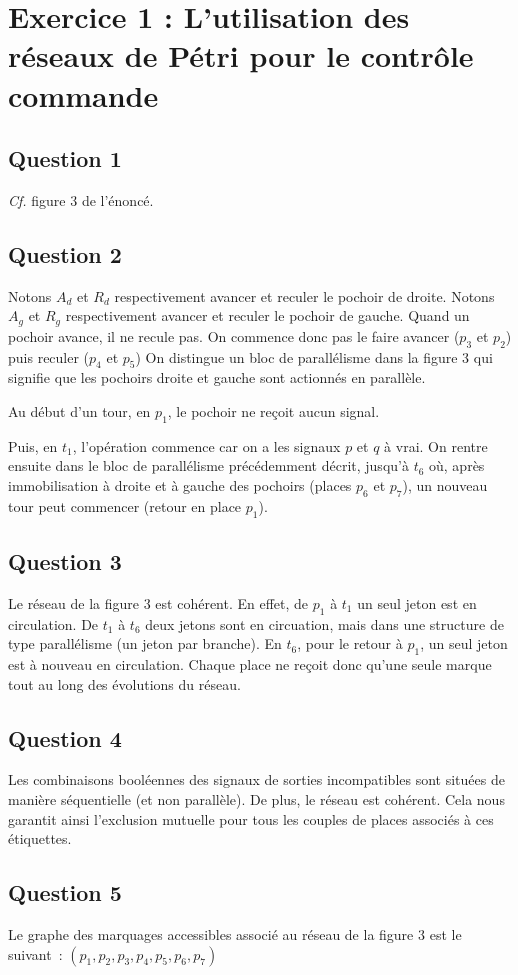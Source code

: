 \section{Exercice 1 : L'utilisation des réseaux de Pétri pour le
  contrôle commande}
\subsection{Question 1}
\textit{Cf.} figure $3$ de l'énoncé.
\subsection{Question 2}
Notons $A_d$ et $R_d$ respectivement avancer et reculer le pochoir de
droite.  Notons $A_g$ et $R_g$ respectivement avancer et reculer le
pochoir de gauche.  Quand un pochoir avance, il ne recule pas.  On
commence donc pas le faire avancer ($p_3$ et $p_2$) puis reculer
($p_4$ et $p_5$) On distingue un bloc de parallélisme dans la figure 3
qui signifie que les pochoirs droite et gauche sont actionnés en
parallèle.

Au début d'un tour, en $p_1$, le pochoir ne reçoit aucun signal.  

Puis, en $t_1$, l'opération commence car on a les signaux $p$ et $q$ à
vrai. On rentre ensuite dans le bloc de parallélisme précédemment
décrit, jusqu'à $t_6$ où, après immobilisation à droite et à gauche
des pochoirs (places $p_6$ et $p_7$), un nouveau tour peut commencer
(retour en place $p_1$).
\subsection{Question 3}
Le réseau de la figure $3$ est cohérent. En effet, de $p_1$ à $t_1$ un
seul jeton est en circulation. De $t_1$ à $t_6$ deux jetons sont en
circuation, mais dans une structure de type parallélisme (un jeton par
branche). En $t_6$, pour le retour à $p_1$, un seul jeton est à
nouveau en circulation. Chaque place ne reçoit donc qu'une seule
marque tout au long des évolutions du réseau.
\subsection{Question 4}
Les combinaisons booléennes des signaux de sorties incompatibles sont
situées de manière séquentielle (et non parallèle). De plus, le réseau
est cohérent. Cela nous garantit ainsi l'exclusion mutuelle pour tous
les couples de places associés à ces étiquettes.
\subsection{Question 5}
Le graphe des marquages accessibles associé au réseau de la figure $3$
est le suivant~:
$(p_1, p_2, p_3, p_4, p_5, p_6, p_7)$

